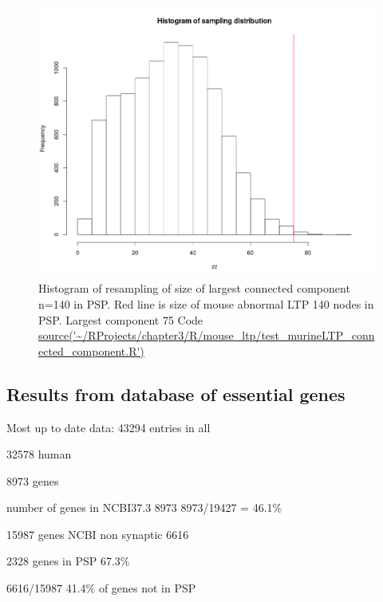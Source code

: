 \begin{figure}
    \centering
    \includegraphics[width=\textwidth]{images/chapter3/connected_components/Rplot_mouse_abnormal_ltp_histogram_MP0002207.png}
    \caption{Histogram of resampling of size of largest connected component n=140 in PSP. Red line is size of mouse abnormal LTP 140 nodes in PSP. Largest component 75 Code\url{ source('~/RProjects/chapter3/R/mouse_ltp/test_murineLTP_connected_component.R')}}
    \label{fig:histogram mouse ltp}
\end{figure}
 
 
 \subsection{Results from database of essential genes}
 
 Most up to date data:
43294 entries in all

32578 human 

8973 genes

number of genes in NCBI37.3 8973
8973/19427 = 46.1\%

15987 genes NCBI non synaptic
6616

2328 genes in PSP 67.3\%

6616/15987 41.4\% of genes not in PSP







